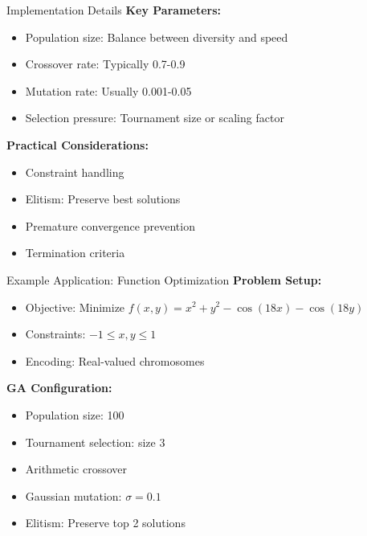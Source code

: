 \documentclass[10pt]{beamer}
\begin{document}
\begin{frame}{Implementation Details}
    \textbf{Key Parameters:}
    \begin{itemize}
        \item Population size: Balance between diversity and speed
        \item Crossover rate: Typically 0.7-0.9
        \item Mutation rate: Usually 0.001-0.05
        \item Selection pressure: Tournament size or scaling factor
    \end{itemize}
    
    \textbf{Practical Considerations:}
    \begin{itemize}
        \item Constraint handling
        \item Elitism: Preserve best solutions
        \item Premature convergence prevention
        \item Termination criteria
    \end{itemize}
\end{frame}

\begin{frame}{Example Application: Function Optimization}
    \textbf{Problem Setup:}
    \begin{itemize}
        \item Objective: Minimize $f(x,y) = x^2 + y^2 - \cos(18x) - \cos(18y)$
        \item Constraints: $-1 \leq x,y \leq 1$
        \item Encoding: Real-valued chromosomes
    \end{itemize}
    
    \textbf{GA Configuration:}
    \begin{itemize}
        \item Population size: 100
        \item Tournament selection: size 3
        \item Arithmetic crossover
        \item Gaussian mutation: $\sigma = 0.1$
        \item Elitism: Preserve top 2 solutions
    \end{itemize}
\end{frame}
\end{document}
